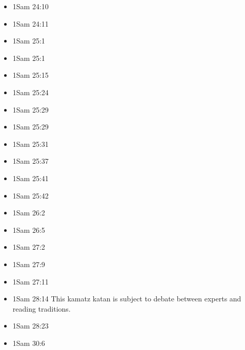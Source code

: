 \documentclass[14pt]{book}
\begin{document}
\begin{multicols}{2}
\begin{itemize}
							\item 1Sam 24:10
							
							\item 1Sam 24:11
							
							\item 1Sam 25:1
							
							\item 1Sam 25:1
							
							\item 1Sam 25:15
							
							\item 1Sam 25:24
							
							\item 1Sam 25:29
							
							\item 1Sam 25:29
							
							\item 1Sam 25:31
							
							\item 1Sam 25:37
							
							\item 1Sam 25:41
							
							\item 1Sam 25:42
							
							\item 1Sam 26:2
							
							\item 1Sam 26:5
							
							\item 1Sam 27:2
							
							\item 1Sam 27:9
							
							\item 1Sam 27:11
							
							\item 1Sam 28:14 This kamatz katan is subject to debate between experts and reading traditions.
							
							\item 1Sam 28:23
							
							\item 1Sam 30:6
							

\end{itemize}
\end{multicols}
\end{document}
